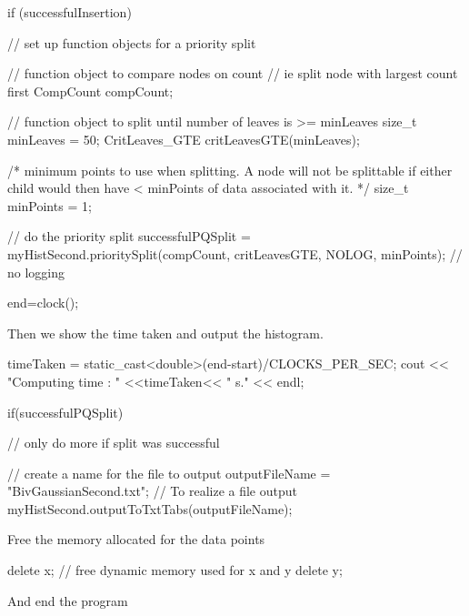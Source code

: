 \begin{DoxyCodeInclude}
    if (successfulInsertion) {

        // set up function objects for a priority split

        // function object to compare nodes on count
        // ie split node with largest count first
        CompCount compCount;

        // function object to split until number of leaves is >= minLeaves
        size_t minLeaves = 50;
        CritLeaves_GTE critLeavesGTE(minLeaves);

        /* minimum points to use when splitting.
        A node will not be splittable if either child would then have
        < minPoints of data associated with it. */
        size_t minPoints = 1;

        // do the priority split
        successfulPQSplit = myHistSecond.prioritySplit(compCount,
                critLeavesGTE, NOLOG, minPoints); // no logging
    }

    end=clock();

\end{DoxyCodeInclude}


\-Then we show the time taken and output the histogram.


\begin{DoxyCodeInclude}
    timeTaken = static_cast<double>(end-start)/CLOCKS_PER_SEC;
    cout << "Computing time : " <<timeTaken<< " s." << endl;


    if(successfulPQSplit) { // only do more if split was successful

        // create a name for the file to output
        outputFileName = "BivGaussianSecond.txt";
        // To realize a file output
        myHistSecond.outputToTxtTabs(outputFileName);

    }

\end{DoxyCodeInclude}


\-Free the memory allocated for the data points


\begin{DoxyCodeInclude}
    delete x;   // free dynamic memory used for x and y
    delete y;

\end{DoxyCodeInclude}


\-And end the program


\begin{DoxyCodeInclude}
    return 0;

} // end of bivariate gaussian test program

\end{DoxyCodeInclude}


